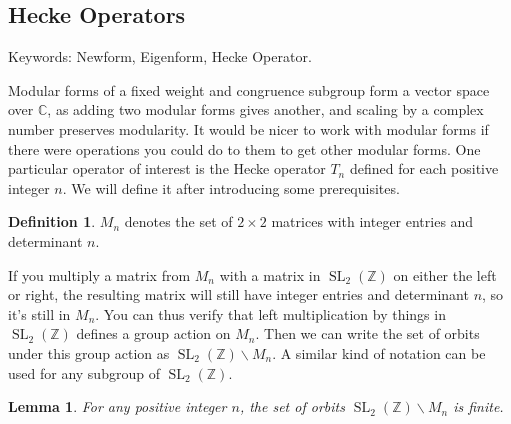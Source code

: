 \documentclass{article}
\newtheorem{lemma}[theorem]{Lemma}
\theoremstyle{definition}
\newtheorem{definition}{Definition}[section]
\theoremstyle{definition}
\theoremstyle{definition}
\newcommand{\SLZ}{\operatorname{SL}_2(\mathbb{Z})}
\begin{document}
\subsection{Hecke Operators}
Keywords: Newform, Eigenform, Hecke Operator. \newline


Modular forms of a fixed weight and congruence subgroup form a vector space over $\mathbb{C}$, as  adding two modular forms gives another, and scaling by a complex number preserves modularity.
\newline\newline
It would be nicer to work with modular forms if there were operations you could do to them to get other modular forms. One particular operator of interest is the Hecke operator $T_n$ defined for each positive integer $n$. We will define it after introducing some prerequisites.

\begin{definition}
    $M_n$ denotes the set of $2\times2$ matrices with integer entries and determinant $n$.
\end{definition}

If you multiply a matrix from $M_n$ with a matrix in $\SLZ$ on either the left or right, the resulting matrix will still have integer entries and determinant $n$, so it's still in $M_n$. You can thus verify that left multiplication by things in $\SLZ$ defines a group action on $M_n$. Then we can write the set of orbits under this group action as $\SLZ \backslash M_n$. A similar kind of notation can be used for any subgroup of $\SLZ$.

\begin{lemma}
    For any positive integer $n$, the set of orbits $\SLZ \backslash M_n$ is finite.
\end{lemma}
\end{document}
